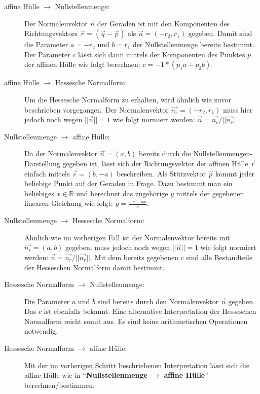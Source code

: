 \documentclass[a4paper]{article}
\begin{document}
\begin{description}
 \item[affine Hülle $\rightarrow$ Nullstellenmenge:] 
 Der Normalenvektor $\vec{n}$ der Geraden ist mit den Komponenten des Richtungsvektors $\vec{r} = (\vec{q} - \vec{p})$
 als $\vec{n} = (-r_2, r_1)$ gegeben. Damit sind die Parameter $a = -r_2$ und $b = r_1$  der Nullstellenmenge bereits bestimmt.
 Der Parameter $c$ lässt sich dann mittels der Komponenten des Punktes $p$ der affinen Hülle wie folgt berechnen: $c = -1 * (p_1a + p_2b)$.
 
 \item[affine Hülle $\rightarrow$ Hessesche Normalform:] Um die Hessesche Normalform zu erhalten, wird ähnlich
 wie zuvor beschrieben vorgegangen. Der Normalenvektor $\vec{n_r} = (-r_2, r_1)$ muss hier jedoch noch wegen $||\vec{n}|| = 1$ wie folgt 
 normiert werden: $\vec{n} = \vec{n_r}/||\vec{n_r}||$.
 
 \item[Nullstellenmenge $\rightarrow$ affine Hülle:]
 Da der Normalenvektor $\vec{n} = (a,b)$ bereits durch die Nullstellenmengen-Darstellung gegeben ist, lässt sich der Richtungsvektor
 der affinen Hülle $\vec{r}$
 einfach mittels $\vec{r} = (b,-a)$ beschreiben. Als Stützvektor $\vec{p}$ kommt jeder beliebige Punkt auf der Geraden in Frage. Dazu bestimmt man ein
 beliebiges $x \in \mathbb{R}$ und berechnet das zugehörige $y$ mittels der gegebenen linearen Gleichung wie folgt: $y = \frac{-c -ax}{b}$.
 
 \item[Nullstellenmenge $\rightarrow$ Hessesche Normalform:]
 Ähnlich wie im vorherigen Fall ist der Normalenvektor bereits mit $\vec{n_r} = (a,b)$ gegeben, muss jedoch noch wegen $||\vec{n}|| = 1$ wie folgt 
 normiert werden: $\vec{n} = \vec{n_r}/||\vec{n_r}||$. Mit dem bereits gegebenen $c$ sind alle Bestandteile der Hesseschen Normalform damit bestimmt. 
 
 \item[Hessesche Normalform $\rightarrow$ Nullstellenmenge:]
 Die Parameter $a$ und $b$ sind bereits durch den Normalenvektor $\vec{n}$ gegeben. Das $c$ ist ebenfalls bekannt. 
 Eine alternative Interpretation der Hesseschen Normalform reicht somit aus. Es sind keine arithmetischen Operationen notwendig. 
 
 \item[Hessesche Normalform $\rightarrow$ affine Hülle:]
 Mit der im vorherigen Schritt beschriebenen Interpretation lässt sich die affine Hülle wie in "`\textbf{Nullstellenmenge $\rightarrow$ affine Hülle}"'
 berechnen/bestimmen. 
 
\end{description}
\end{document}
